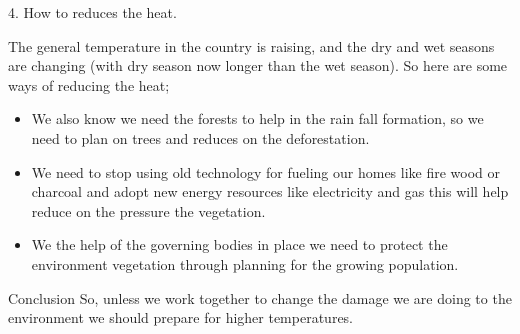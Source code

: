 \documentclass{article}
\begin{document}
4.	How to reduces the heat.

The general temperature in the country is raising, and the dry and wet seasons are changing (with dry season now longer than the wet season). So here are some ways of reducing the heat;

\begin{itemize}
\item We also know we need the forests to help in the rain fall formation, so we need to plan on trees and reduces on the deforestation.
\item We need to stop using old technology for fueling our homes like fire wood or charcoal and adopt new energy resources like electricity and gas this will help reduce on the pressure the vegetation.
\item We the help of the governing bodies in place we need to protect the environment vegetation through planning for the growing population. 
\end{itemize}

Conclusion 
So, unless we work together to change the damage we are doing to the environment we should prepare for higher temperatures. 
\end{document}
